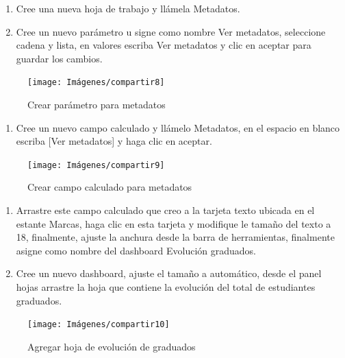 \documentclass[
]{book}
\providecommand{\tightlist}{%
  \setlength{\itemsep}{0pt}\setlength{\parskip}{0pt}}
\begin{document}
\begin{enumerate}
\def\labelenumi{\arabic{enumi}.}
\item
  Cree una nueva hoja de trabajo y llámela Metadatos.
\item
  Cree un nuevo parámetro u signe como nombre Ver metadatos, seleccione cadena y lista, en valores escriba Ver metadatos y clic en aceptar para guardar los cambios.
\end{enumerate}

\begin{figure}

{\centering \texttt{[image: Imágenes/compartir8]} 

}

\caption{Crear parámetro para metadatos}\label{fig:parametrometadatos-fig}
\end{figure}

\begin{enumerate}
\def\labelenumi{\arabic{enumi}.}
\setcounter{enumi}{2}
\tightlist
\item
  Cree un nuevo campo calculado y llámelo Metadatos, en el espacio en blanco escriba {[}Ver metadatos{]} y haga clic en aceptar.
\end{enumerate}

\begin{figure}

{\centering \texttt{[image: Imágenes/compartir9]} 

}

\caption{Crear campo calculado para metadatos}\label{fig:campocalculadometadatos-fig}
\end{figure}

\begin{enumerate}
\def\labelenumi{\arabic{enumi}.}
\setcounter{enumi}{3}
\item
  Arrastre este campo calculado que creo a la tarjeta texto ubicada en el estante Marcas, haga clic en esta tarjeta y modifique le tamaño del texto a 18, finalmente, ajuste la anchura desde la barra de herramientas, finalmente asigne como nombre del dashboard Evolución graduados.
\item
  Cree un nuevo dashboard, ajuste el tamaño a automático, desde el panel hojas arrastre la hoja que contiene la evolución del total de estudiantes graduados.
\end{enumerate}

\begin{figure}

{\centering \texttt{[image: Imágenes/compartir10]} 

}

\caption{Agregar hoja de evolución de graduados}\label{fig:evolucion-fig}
\end{figure}
\end{document}
